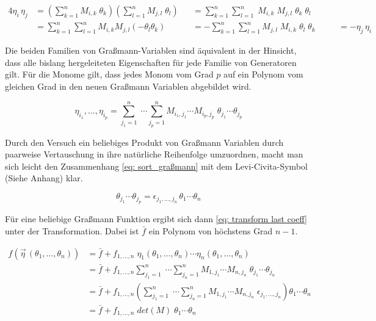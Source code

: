 \begin{alignat}{4}
    \eta_i \,\eta_j 
        &= \left(\sum_{k=1}^n M_{i,k} \; \theta_k  \right) \left(\sum_{l=1}^n M_{j,l} \;\theta_l\right)     
        &&= \sum_{k=1}^n \sum_{l=1}^n\; M_{i,k}\; M_{j,l} \;\theta_k \;\theta_l &&& \nonumber \\
        &= \sum_{k=1}^n \sum_{l=1}^n M_{i,k} M_{j,l} \left(-\theta_l \theta_k \right)\
        &&= - \sum_{k=1}^n \sum_{l=1}^n M_{j,l}\; M_{i,k} \;\theta_l \;\theta_k &&&\;= - \eta_j  \,\eta_i \label{eq: conservation of antikommutativity}
\end{alignat}

\noindent Die beiden Familien von Graßmann-Variablen sind äquivalent in der Hinsicht, dass alle bislang hergeleiteten Eigenschaften für jede Familie von Generatoren gilt. Für die Monome gilt, dass jedes Monom vom Grad $p$ auf ein Polynom vom gleichen Grad in den neuen Graßmann Variablen abgebildet wird.

$$ \eta_{i_1}, \dots, \eta_{i_p} = \sum_{{j_1}=1}^n\;\cdots \sum_{{j_p}=1}^n M_{{i_1},{j_1}}\cdots M_{{i_p},{j_p}}\;\theta_{j_1} \cdots \theta_{j_p} $$

\noindent Durch den Versuch ein beliebiges Produkt von Graßmann Variablen durch paarweise Vertauschung in ihre natürliche Reihenfolge umzuordnen, macht man sich leicht den Zusammenhang \eqref{eq: sort_graßmann} mit dem Levi-Civita-Symbol (Siehe Anhang) klar.   

\begin{equation} \label{eq: sort_graßmann}
\theta_{j_1} \cdots \theta_{j_p} = \epsilon_{j_1,\dots,j_n} \, \theta_{1} \cdots \theta_{n}
\end{equation}

\noindent Für eine beliebige Graßmann Funktion ergibt sich dann \eqref{eq: transform last coeff} unter der Transformation. Dabei ist $\bar f$ ein Polynom von höchstens Grad $n-1$.

\begin{align}
f(\vec{\eta}\,(\theta_1, \dots, \theta_n))
&= \bar{f} + f_{1,\dots,n}\;\eta_1(\theta_1, \dots, \theta_n)\cdots\eta_n(\theta_1, \dots, \theta_n) \nonumber \\
&= \bar{f} + f_{1,\dots,n} \sum_{{j_1}=1}^n\;\cdots \sum_{{j_n}=1}^n M_{{1},{j_1}}\cdots M_{{n},{j_n}}\;\theta_{j_1} \cdots \theta_{j_n} \nonumber \\
&= \bar{f} + f_{1,\dots,n} \left(\sum_{{j_1}=1}^n\;\cdots \sum_{{j_n}=1}^n M_{{1},{j_1}}\cdots M_{{n},{j_n}}\; \epsilon_{j_1,\dots,j_n}\right) \theta_{1} \cdots \theta_{n} \nonumber \\
&= \bar{f} + f_{1,\dots,n} \; det(M) \; \theta_{1} \cdots \theta_{n} \label{eq: transform last coeff} 
\end{align}

